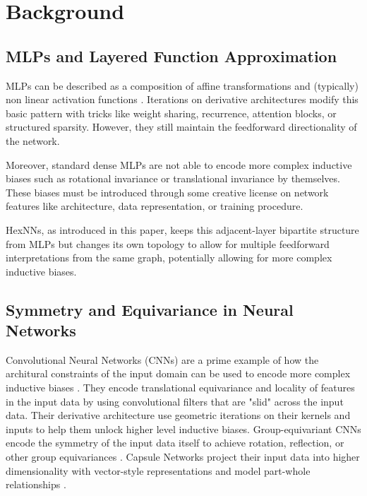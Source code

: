 \section{Background}

\subsection{MLPs and Layered Function Approximation}

MLPs can be described as a composition of affine transformations and (typically) non linear activation functions \cite{cybenko1989approximation,hornik1989multilayer}.
Iterations on derivative architectures modify this basic pattern with tricks like weight sharing, recurrence, attention blocks, or structured sparsity.
However, they still maintain the feedforward directionality of the network.

Moreover, standard dense MLPs are not able to encode more complex inductive biases such as rotational invariance or translational invariance by themselves.
These biases must be introduced through some creative license on network features like architecture, data representation, or training procedure.

HexNNs, as introduced in this paper, keeps this adjacent-layer bipartite structure from MLPs but changes its own topology to allow for multiple feedforward interpretations from the same graph, potentially allowing for more complex inductive biases.


\subsection{Symmetry and Equivariance in Neural Networks}

Convolutional Neural Networks (CNNs) are a prime example of how the architural constraints of the input domain can be used to encode more complex inductive biases \cite{lecun1998gradient,fukushima1980neocognitron}.
They encode translational equivariance and locality of features in the input data by using convolutional filters that are "slid" across the input data.
Their derivative architecture use geometric iterations on their kernels and inputs to help them unlock higher level inductive biases.
Group-equivariant CNNs encode the symmetry of the input data itself to achieve rotation, reflection, or other group equivariances \cite{cohen2016group,worrall2017harmonic}.
Capsule Networks project their input data into higher dimensionality with vector-style representations and model part-whole relationships \cite{sabour2017dynamic}.


